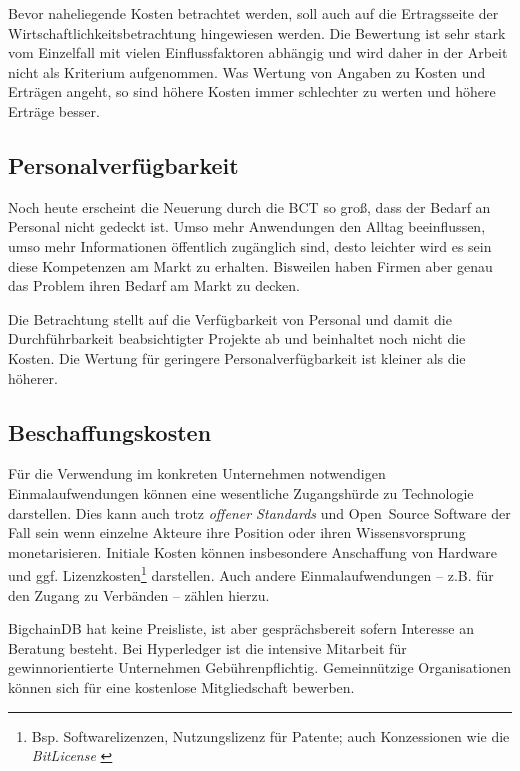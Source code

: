 Bevor naheliegende Kosten betrachtet werden, soll auch auf die Ertragsseite der Wirtschaftlichkeitsbetrachtung hingewiesen werden.
Die Bewertung ist sehr stark vom Einzelfall mit vielen Einflussfaktoren abhängig und wird daher in der Arbeit nicht als Kriterium aufgenommen.
Was Wertung von Angaben zu Kosten und Erträgen angeht, so sind höhere Kosten immer schlechter zu werten und höhere Erträge besser.

\subsection{Personalverfügbarkeit}\label{krit:personal}

Noch heute erscheint die Neuerung durch die \gls{BCT} so groß, dass der Bedarf an Personal nicht gedeckt ist.
Umso mehr Anwendungen den Alltag beeinflussen, umso mehr Informationen öffentlich zugänglich sind, desto leichter wird es sein diese Kompetenzen am Markt zu erhalten.
Bisweilen haben Firmen aber genau das Problem ihren Bedarf am Markt zu decken.

Die Betrachtung stellt auf die Verfügbarkeit von Personal und damit die Durchführbarkeit beabsichtigter Projekte ab und beinhaltet noch nicht die Kosten. 
Die Wertung für geringere Personalverfügbarkeit ist kleiner als die höherer.

\subsection{Beschaffungskosten}\label{kosten}

Für die Verwendung im konkreten Unternehmen notwendigen Einmalaufwendungen können eine wesentliche Zugangshürde zu Technologie darstellen.
Dies kann auch trotz \emph{offener Standards} und Open~Source Software der Fall sein wenn einzelne Akteure ihre Position oder ihren Wissensvorsprung monetarisieren.
Initiale Kosten können insbesondere Anschaffung von Hardware und ggf. Lizenzkosten\footnote{Bsp. Softwarelizenzen, Nutzungslizenz für Patente; auch Konzessionen wie die \emph{BitLicense} \autocite{w:bitlicense}} darstellen.
Auch andere Einmalaufwendungen -- z.B. für den Zugang zu Verbänden -- zählen hierzu.

BigchainDB hat keine Preisliste, ist aber gesprächsbereit sofern Interesse an Beratung besteht.
Bei Hyperledger ist die intensive Mitarbeit für gewinnorientierte Unternehmen Gebührenpflichtig.
Gemeinnützige Organisationen können sich für eine kostenlose Mitgliedschaft bewerben.

